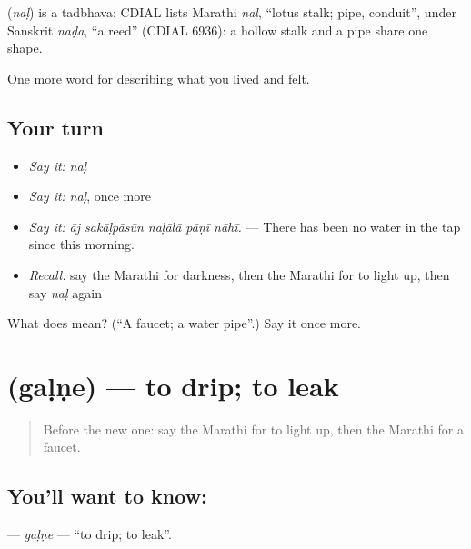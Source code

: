 \begin{cousinweb}
\textbf{} (\emph{naḷ}) is a tadbhava: CDIAL lists Marathi \emph{naḷ}, \textquotedblleft{}lotus stalk; pipe, conduit\textquotedblright{}, under Sanskrit \emph{naḍa}, \textquotedblleft{}a reed\textquotedblright{} (CDIAL 6936): a hollow stalk and a pipe share one shape.
\end{cousinweb}

\begin{grammarlens}[title={What you've built}]
One more word for describing what you lived and felt.
\end{grammarlens}

\subsection*{Your turn}
\begin{itemize}
\raggedright
  \item \emph{Say it:} \emph{naḷ}
  \item \emph{Say it:} \emph{naḷ}, once more
  \item \emph{Say it:} \emph{āj sakāḷpāsūn naḷālā pāṇī nāhī.} — There has been no water in the tap since this morning.
  \item \emph{Recall:} say the Marathi for darkness, then the Marathi for to light up, then say \emph{naḷ} again
\end{itemize}

\begin{tcolorbox}[breakable,colback=teal!4,colframe=teal!35!black,title={Before you move on}]
What does  mean? (\textquotedblleft{}A faucet; a water pipe\textquotedblright{}.) Say it once more.
\end{tcolorbox}
\section[\texorpdfstring{\mr{गळणे} (gaḷṇe)}{गळणे (gaḷṇe)}]{ (gaḷṇe) — to drip; to leak}

\label{lesson:MR-C520-galne}



\begin{quote}
Before the new one: say the Marathi for to light up, then the Marathi for a faucet.
\end{quote}

\subsection*{You'll want to know: }
\textbf{} — \emph{gaḷṇe} — \textquotedblleft{}to drip; to leak\textquotedblright{}.

